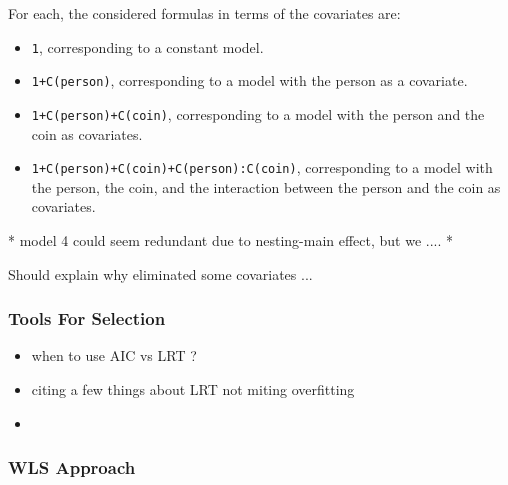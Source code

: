 \documentclass[a4paper, 12pt,oneside]{article}
\begin{document}
			For each, the considered formulas in terms of the covariates are:
			\begin{itemize}
				\item \texttt{1}, corresponding to a constant model.
				\item \texttt{1+C(person)}, corresponding to a model with the person as a covariate.
				\item \texttt{1+C(person)+C(coin)}, corresponding to a model with the person and the coin as covariates.
				\item \texttt{1+C(person)+C(coin)+C(person):C(coin)}, corresponding to a model with the person, the coin, and the interaction between the person and the coin as covariates.
			\end{itemize}
			* model 4 could seem redundant due to nesting-main effect, but we ....
			*  

			Should explain why eliminated some covariates ...
			\subsubsection{Tools For Selection}
			\begin{itemize}
				\item when to use AIC vs LRT ?
				\item citing a few things about LRT not miting overfitting 
				\item 
			\end{itemize}
			\subsubsection{WLS Approach}
\end{document}
